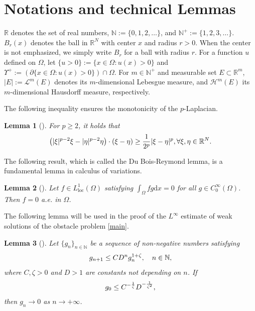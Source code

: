 \documentclass[onecolumn]{autart}
\newtheorem{lemma}{Lemma}
\begin{document}
\section{Notations and technical Lemmas}\label{Sec.2}
$\mathbb{R}$ denotes the set of real numbers, $\mathbb{N} := \{0,1,2,\dots\}$, and $\mathbb{N}^+ := \{1,2,3,\dots\}$.
$B_r(x)$ denotes the ball in    $ \mathbb{R}^N  $ with center $x$ and radius $r>0$. When the center is not emphasized, we simply write $B_r$   for a ball with radius $r$.
For a function $u$ defined on $\Omega$, let %
$\{u > 0\} := \{x \in \Omega : u(x) > 0\}$  and $\Upsilon^+ := \left(\partial\{x \in \Omega : u(x) > 0\}\right) \cap \Omega$.
For $m\in\mathbb{N}^+$ and   measurable set $E \subset \mathbb{R}^m$, $|E| := \mathcal{L}^m(E)$ denotes its $m$-dimensional Lebesgue measure, and $\mathcal{H}^m(E)$ its $m$-dimensional Hausdorff measure, respectively.

The following inequality ensures the monotonicity of the $p$-Laplacian.
\begin{lemma}[{\cite[p.13]{DiBenedetto:1993}}]\label{Lemma6}  For $ p\geq2$, it holds that
	\begin{align}
		\left( |\xi|^{p-2}\xi-|\eta|^{p-2}\eta \right)  \cdot (\xi-\eta) \geq  \frac{1}{2^p}|\xi-\eta|^{p}, \forall \xi,\eta \in \mathbb{R}^N.\notag
	\end{align}	
\end{lemma}


The following  result, which is  called the Du Bois-Reymond lemma, is a fundamental lemma    in calculus of variations.
\begin{lemma}[{\cite[Corollary 4.24]{Brezis:2010}}] \label{lem5}
	Let $f \in L^{1}_{\mathrm{loc}}(\Omega)$ satisfying $\int_{\Omega} f g \mathrm{d}x = 0$ for all $g \in C_{0}^{\infty}(\Omega)$. Then $f = 0$ a.e. in $\Omega$.
\end{lemma}


The following lemma will be used in the proof of the $L^\infty$ estimate of weak solutions of  the  obstacle problem \eqref{main}.
\begin{lemma}[\cite{Ladyzhenskaya:1968}] \label{lem1}
	Let $\{g_n\}_{n \in \mathbb{N}}$ be a sequence of non-negative numbers satisfying
	\begin{align}
		g_{n+1} \leq C D^n g_n^{1+\zeta}, \quad n \in \mathbb{N},\notag
	\end{align}
	where $C,\zeta > 0$ and $D > 1$ are constants not depending on $n$. If
	\begin{align}
		g_0 \leq C^{-\frac{1}{\zeta}} D^{-\frac{1}{\zeta^{2}}},\notag
	\end{align}
	then $g_n \to 0$ as $n \to +\infty$.
\end{lemma}
\end{document}

